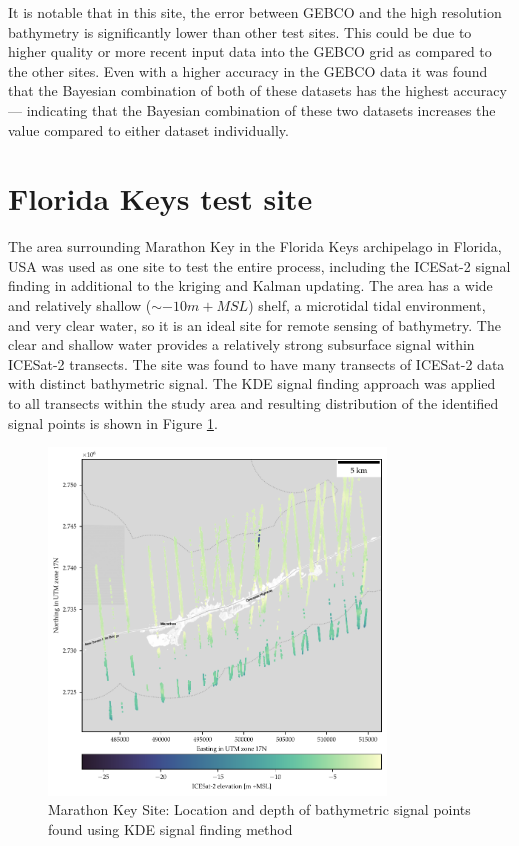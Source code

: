 It is notable that in this site, the error between GEBCO and the high resolution bathymetry is significantly lower than other test sites. This could be due to higher quality or more recent input data into the GEBCO grid as compared to the other sites. Even with a higher accuracy in the GEBCO data it was found that the Bayesian combination of both of these datasets has the highest accuracy --- indicating that the Bayesian combination of these two datasets increases the value compared to either dataset individually.




\section{Florida Keys test site}


The area surrounding Marathon Key in the Florida Keys archipelago in Florida, USA was used as one site to test the entire process, including the ICESat-2 signal finding in additional to the kriging and Kalman updating. The area has a wide and relatively shallow ($\sim -10 m +MSL$) shelf, a microtidal tidal environment, and very clear water, so it is an ideal site for remote sensing of bathymetry. The clear and shallow water provides a relatively strong subsurface signal within ICESat-2 transects. The site was found to have many transects of ICESat-2 data with distinct bathymetric signal. The KDE signal finding approach was applied to all transects within the study area and resulting distribution of the identified signal points is shown in Figure \ref{fig:keys-photons}.

\begin{figure}[!ht]
    \centering
    \includegraphics[width=0.8\textwidth]{figures/florida_keys_photon_map.pdf}
    \caption{Marathon Key Site: Location and depth of bathymetric signal points found using KDE signal finding method}
    \label{fig:keys-photons}
\end{figure}

